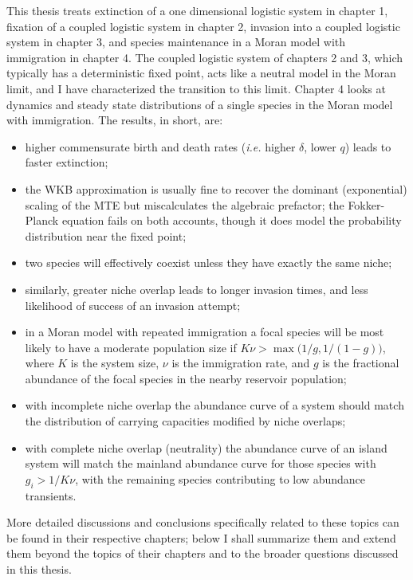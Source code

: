 This thesis treats extinction of a one dimensional logistic system in chapter 1, fixation of a coupled logistic system in chapter 2, invasion into a coupled logistic system in chapter 3, and species maintenance in a Moran model with immigration in chapter 4. %
The coupled logistic system of chapters 2 and 3, which typically has a deterministic fixed point, acts like a neutral model in the Moran limit, and I have characterized the transition to this limit. 
Chapter 4 looks at dynamics and steady state distributions of a single species in the Moran model with immigration. %
The results, in short, are: 
\begin{itemize}
	\item higher commensurate birth and death rates (\emph{i.e.} higher $\delta$, lower $q$) leads to faster extinction; 
	\item the WKB approximation is usually fine to recover the dominant (exponential) scaling of the MTE but miscalculates the algebraic prefactor; the Fokker-Planck equation fails on both accounts, though it does model the probability distribution near the fixed point; 
	\item two species will effectively coexist unless they have exactly the same niche; 
	\item similarly, greater niche overlap leads to longer invasion times, and less likelihood of success of an invasion attempt; 
	\item in a Moran model with repeated immigration a focal species will be most likely to have a moderate population size if $K\nu > \max\big(1/g,1/(1-g)\big)$, where $K$ is the system size, $\nu$ is the immigration rate, and $g$ is the fractional abundance of the focal species in the nearby reservoir population;
	\item with incomplete niche overlap the abundance curve of a system should match the distribution of carrying capacities modified by niche overlaps;
	\item with complete niche overlap (neutrality) the abundance curve of an island system will match the mainland abundance curve for those species with $g_i>1/K\nu$, with the remaining species contributing to low abundance transients. 
\end{itemize}
More detailed discussions and conclusions specifically related to these topics can be found in their respective chapters; below I shall summarize them and extend them beyond the topics of their chapters and to the broader questions discussed in this thesis. 

